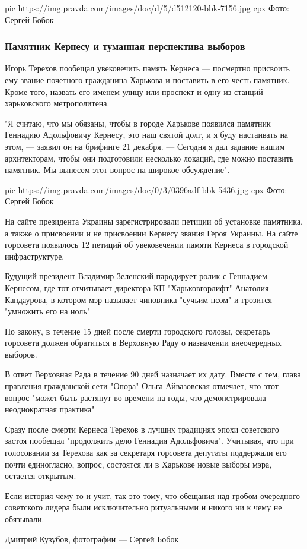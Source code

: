 \ifcmt
pic https://img.pravda.com/images/doc/d/5/d512120-bbk-7156.jpg
cpx Фото: Сергей Бобок
\fi

\subsubsection{Памятник Кернесу и туманная перспектива выборов}

Игорь Терехов пообещал увековечить память Кернеса — посмертно присвоить ему
звание почетного гражданина Харькова и поставить в его честь памятник. Кроме
того, назвать его именем улицу или проспект и одну из станций харьковского
метрополитена.

"Я считаю, что мы обязаны, чтобы в городе Харькове появился памятник Геннадию
Адольфовичу Кернесу, это наш святой долг, и я буду настаивать на этом, — заявил
он на брифинге 21 декабря. — Сегодня я дал задание нашим архитекторам, чтобы
они подготовили несколько локаций, где можно поставить памятник. Мы вынесем
этот вопрос на широкое обсуждение".

\ifcmt
pic https://img.pravda.com/images/doc/0/3/0396adf-bbk-5436.jpg
cpx Фото: Сергей Бобок
\fi

На сайте президента Украины зарегистрировали петиции об установке памятника, а
также о присвоении и не присвоении Кернесу звания Героя Украины. На сайте
горсовета появилось 12 петиций об увековечении памяти Кернеса в городской
инфраструктуре.

\begin{leftbar}
  \begingroup
    \em\Large\bfseries\color{blue}

Будущий президент Владимир Зеленский пародирует ролик с Геннадием Кернесом, где
тот отчитывает директора КП "Харьковгорлифт" Анатолия Кандаурова, в
котором мэр называет чиновника "сучьим псом" и грозится "умножить его
на ноль"
  \endgroup
\end{leftbar}

По закону, в течение 15 дней после смерти городского головы, секретарь
горсовета должен обратиться в Верховную Раду о назначении внеочередных выборов.

В ответ Верховная Рада в течение 90 дней назначает их дату. Вместе с тем, глава
правления гражданской сети "Опора" Ольга Айвазовская отмечает, что этот вопрос
"может быть растянут во времени на годы, что демонстрировала неоднократная
практика"

Сразу после смерти Кернеса Терехов в лучших традициях эпохи советского застоя
пообещал "продолжить дело Геннадия Адольфовича". Учитывая, что при голосовании
за Терехова как за секретаря горсовета депутаты поддержали его почти
единогласно, вопрос, состоятся ли в Харькове новые выборы мэра, остается
открытым.

Если история чему-то и учит, так это тому, что обещания над гробом очередного
советского лидера были исключительно ритуальными и никого ни к чему не
обязывали. 

Дмитрий Кузубов, фотографии — Сергей Бобок
